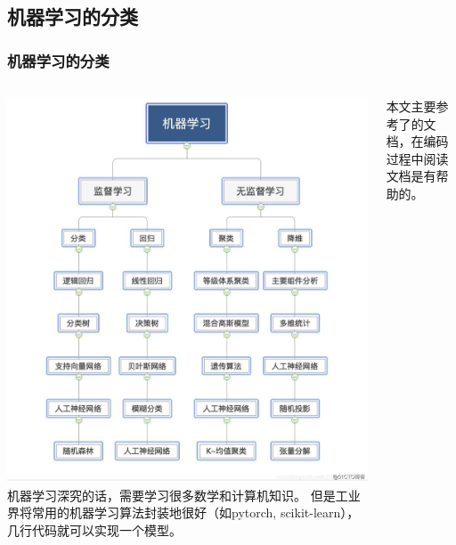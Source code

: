 \documentclass{ctexbeamer}
\begin{document}
\subsection{机器学习的分类}
\begin{frame}
    \frametitle{机器学习的分类}
    \begin{columns}
        \includegraphics[width=.9\textwidth]{../lib/机器学习.jpeg}
        机器学习深究的话，需要学习很多数学和计算机知识。
        但是工业界将常用的机器学习算法封装地很好（如pytorch, scikit-learn），几行代码就可以实现一个模型。

        本文主要参考了\textcite{scikit-learn}的文档，在编码过程中阅读文档是有帮助的。
    \end{columns}
\end{frame}
\end{document}
